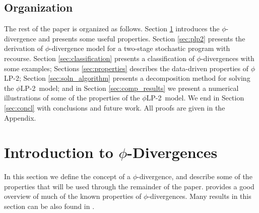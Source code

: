 \documentclass[ijoc,letterpaper]{informs3} %
\newcommand{\plp}{$\phi$LP-2}
\begin{document}

\subsection{Organization}

The rest of the paper is organized as follows.
Section \ref{sec:phi_divergences} introduces the $\phi$-divergence and presents some useful properties.
Section \ref{sec:plp2} presents the derivation of $\phi$-divergence model for a two-stage stochastic program with recourse.
Section \ref{sec:classification} presents a classification of $\phi$-divergences with some examples;
Sections \ref{sec:properties} describes the data-driven properties of \plp; 
Section \ref{sec:soln_algorithm} presents a decomposition method for solving the \plp\ model; and in Section \ref{sec:comp_results} we present a numerical illustrations of some of the properties of the \plp\ model.
We end in Section \ref{sec:concl} with conclusions and future work.
All proofs are given in the Appendix.

\section{Introduction to $\phi$-Divergences}
\label{sec:phi_divergences}

In this section we define the concept of a $\phi$-divergence, and describe some of the properties that will be used through the remainder of the paper.
\cite{pardo2005statistical} provides a good overview of much of the known properties of $\phi$-divergences.
Many results in this section can be also found in \citep{bental2011robust}.
\end{document}
